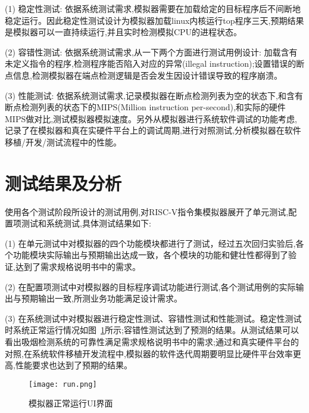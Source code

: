 (1)	稳定性测试: 依据系统测试需求,模拟器需要在加载给定的目标程序后不间断地稳定运行。因此稳定性测试设计为模拟器加载linux内核运行top程序三天,预期结果是模拟器可以一直持续运行,并且实时检测模拟CPU的进程状态。


(2)	容错性测试: 依据系统测试需求,从一下两个方面进行测试用例设计: 加载含有未定义指令的程序,检测程序能否陷入对应的异常(illegal instruction);设置错误的断点信息,检测模拟器在端点检测逻辑是否会发生因设计错误导致的程序崩溃。


(3)	性能测试: 依据系统测试需求,记录模拟器在断点检测列表为空的状态下,和含有断点检测列表的状态下的MIPS(Million instruction per-second),和实际的硬件MIPS做对比,测试模拟器模拟速度。另外从模拟器进行系统软件调试的功能考虑,记录了在模拟器和真在实硬件平台上的调试周期,进行对照测试,分析模拟器在软件移植/开发/测试流程中的性能。

\section{测试结果及分析}
使用各个测试阶段所设计的测试用例,对RISC-V指令集模拟器展开了单元测试,配置项测试和系统测试,具体测试结果如下:


(1) 在单元测试中对模拟器的四个功能模块都进行了测试，经过五次回归实验后,各个功能模块实际输出与预期输出达成一致，各个模块的功能和健壮性都得到了验证,达到了需求规格说明书中的需求。


(2) 在配置项测试中对模拟器的目标程序调试功能进行测试,各个测试用例的实际输出与预期输出一致,所测业务功能满足设计需求。


(3) 在系统测试中对模拟器进行稳定性测试、容错性测试和性能测试。稳定性测试时系统正常运行情况如图~\ref{fig:run}所示;容错性测试达到了预测的结果。从测试结果可以看出吸烟检测系统的可靠性满足需求规格说明书中的需求;通过和真实硬件平台的对照,在系统软件移植开发流程中,模拟器的软件迭代周期要明显比硬件平台效率更高,性能要求也达到了预期的结果。 
\begin{figure}[h]
  \centering
  \texttt{[image: run.png]}
  \caption{模拟器正常运行UI界面}
  \label{fig:run}
\end{figure}

